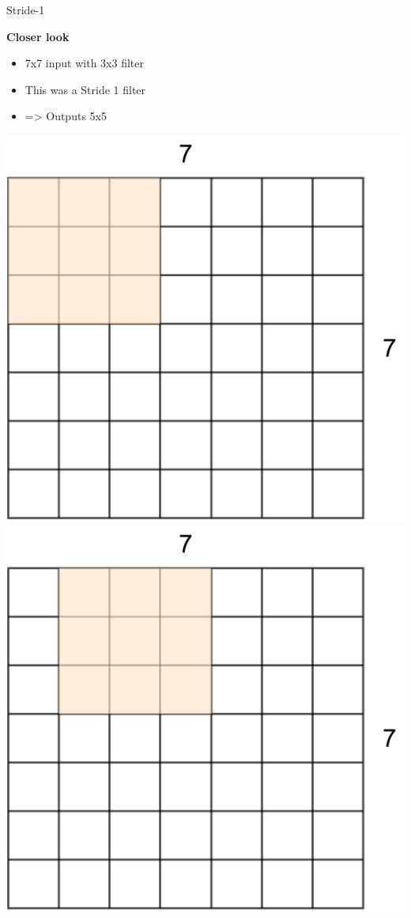\documentclass[default, aspectratio=169]{beamer}
\begin{document}
	
	\begin{frame}{Stride-1}
		\vspace{0.5cm}
		
		\normalsize \textbf{Closer look}
		\begin{itemize}
			\item 7x7 input with 3x3 filter
			\item This was a Stride 1 filter
			\item=> Outputs 5x5
		\end{itemize}
		
		\includegraphics[keepaspectratio, scale=0.13]{pic/Stride1.png}
		\includegraphics[keepaspectratio, scale=0.13]{pic/Stride2.png}

\end{frame}
\end{document}
